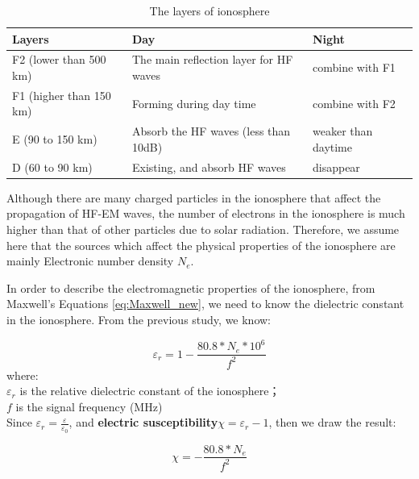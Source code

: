 \documentclass{mcmthesis}
\begin{document}
        \begin{table}
          \centering
            \begin{tabular}{|l|l|l|}
            \hline
            Layers                  &Day & Night      \\ \hline
            F2 (lower than 500 km)  & The main reflection layer for HF waves & combine with F1          \\ \hline
            F1 (higher than 150 km) & Forming during day time       & combine with F2    \\ \hline
            E  (90 to 150 km)       & Absorb the HF waves (less than 10dB) & weaker than daytime          \\ \hline
            D  (60 to 90 km)        & Existing, and absorb HF waves &disappear  \\ \hline
            \end{tabular}
            \caption{The layers of ionosphere}
            \label{tab: the ionosphere layers}
        \end{table}

    Although there are many charged particles in the ionosphere that affect the propagation of HF-EM waves, the number of electrons in the ionosphere is much higher than that of other particles due to solar radiation. Therefore, we assume here that the sources which affect the physical properties of the ionosphere are mainly Electronic number density $N_{e}$.

    In order to describe the electromagnetic properties of the ionosphere, from Maxwell's Equations \ref{eq:Maxwell_new}, we need to know the dielectric constant in the ionosphere. From the previous study\cite{davies1990ionospheric}, we know:

      \begin{equation}\label{eq:relative_dielectric}
        \varepsilon_{r} = 1 - \frac{80.8 * N_{e} * 10^{6}}{f^{2}}
      \end{equation}
      where:\\
      $\varepsilon_{r}$ is the relative dielectric constant of the ionosphere；\\
      $f$ is the signal frequency (MHz) \\

    Since $\varepsilon_{r} = \frac{\varepsilon}{\varepsilon_{0}}$, and \textbf{electric susceptibility}$\chi = \varepsilon_{r} - 1$, then we draw the result:

      \begin{equation}\label{eq:chi}
        \chi = - \frac{80.8 * N_{e}}{f^{2}}
      \end{equation}
\end{document}
